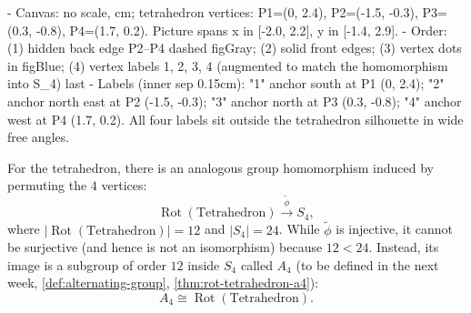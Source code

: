 \begin{content}
\begin{hidden}
- Canvas: no scale, cm; tetrahedron vertices: P1=(0, 2.4), P2=(-1.5, -0.3), P3=(0.3, -0.8), P4=(1.7, 0.2).
  Picture spans x in [-2.0, 2.2], y in [-1.4, 2.9].
- Order: (1) hidden back edge P2--P4 dashed figGray; (2) solid front edges; (3) vertex dots in figBlue;
  (4) vertex labels 1, 2, 3, 4 (augmented to match the homomorphism into S_4) last
- Labels (inner sep 0.15cm):
  "1" anchor south at P1 (0, 2.4); "2" anchor north east at P2 (-1.5, -0.3);
  "3" anchor north at P3 (0.3, -0.8); "4" anchor west at P4 (1.7, 0.2).
  All four labels sit outside the tetrahedron silhouette in wide free angles.
\end{hidden}
\begin{center}
\end{center}


For the tetrahedron, there is an analogous group homomorphism induced by permuting the $4$ vertices:
\[
\operatorname{Rot}(\text{Tetrahedron}) \xrightarrow{\tilde{\phi}} S_4,
\]
where $|\operatorname{Rot}(\text{Tetrahedron})| = 12$ and $|S_4| = 24$. While $\tilde{\phi}$ is injective, it cannot be surjective (and hence is not an isomorphism) because $12 < 24$. Instead, its image is a subgroup of order $12$ inside $S_4$ called $A_4$ (to be defined in the next week, \cref{def:alternating-group}, \cref{thm:rot-tetrahedron-a4}):
\[
A_4 \cong \operatorname{Rot}(\text{Tetrahedron}).
\]
\end{content}

